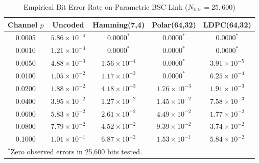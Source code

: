 \documentclass[conference]{IEEEtran}
\begin{document}
\begin{table}[t]
\caption{Empirical Bit Error Rate on Parametric BSC Link ($N_{\text{bits}} = 25,600$)}
\label{tab:bsc_results}
\centering
\begin{tabular}{ccccc}
\toprule
\textbf{Channel $p$} & \textbf{Uncoded} & \textbf{Hamming(7,4)} & \textbf{Polar(64,32)} & \textbf{LDPC(64,32)} \\
\midrule
0.0005 & $5.86 \times 10^{-4}$ & $0.0000^*$ & $0.0000^*$ & $0.0000^*$ \\
0.0010 & $1.21 \times 10^{-3}$ & $0.0000^*$ & $0.0000^*$ & $0.0000^*$ \\
0.0050 & $4.88 \times 10^{-3}$ & $1.56 \times 10^{-4}$ & $0.0000^*$ & $3.91 \times 10^{-5}$ \\
0.0100 & $1.05 \times 10^{-2}$ & $1.17 \times 10^{-3}$ & $0.0000^*$ & $6.25 \times 10^{-4}$ \\
0.0200 & $1.88 \times 10^{-2}$ & $4.18 \times 10^{-3}$ & $1.76 \times 10^{-3}$ & $1.91 \times 10^{-3}$ \\
0.0400 & $3.95 \times 10^{-2}$ & $1.27 \times 10^{-2}$ & $1.45 \times 10^{-2}$ & $7.58 \times 10^{-3}$ \\
0.0600 & $5.83 \times 10^{-2}$ & $2.61 \times 10^{-2}$ & $4.49 \times 10^{-2}$ & $1.77 \times 10^{-2}$ \\
0.0800 & $7.79 \times 10^{-2}$ & $4.52 \times 10^{-2}$ & $9.39 \times 10^{-2}$ & $3.74 \times 10^{-2}$ \\
0.1000 & $1.01 \times 10^{-1}$ & $6.87 \times 10^{-2}$ & $1.53 \times 10^{-1}$ & $5.84 \times 10^{-2}$ \\
\bottomrule
\multicolumn{5}{l}{\footnotesize $^*$Zero observed errors in 25,600 bits tested.}
\end{tabular}
\end{table}
\end{document}
